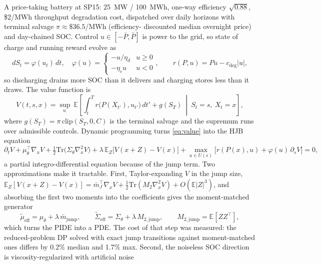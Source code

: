 \documentclass[11pt]{article}
\begin{document}
A price-taking battery at SP15: 25~MW / 100~MWh, one-way efficiency
$\sqrt{0.88}$, \$2/MWh throughput degradation cost, dispatched over daily
horizons with terminal salvage $\pi \approx \$36.5$/MWh (efficiency-%
discounted median overnight price) and day-chained SOC. Control $u \in [-\bar P, \bar P]$ is power to the grid, so state of charge
and running reward evolve as
\begin{equation}
dS_t = \varphi(u_t)\,dt, \quad
\varphi(u) = \begin{cases} -u/\eta_d & u \ge 0 \\ -\eta_c u & u < 0
\end{cases}, \qquad r(P, u) = Pu - c_{\deg}|u| ,
\label{eq:soc}
\end{equation}
so discharging drains more SOC than it delivers and charging stores less
than it draws. The value function is
\begin{equation}
V(t, s, x) = \sup_{u_\cdot}\ \mathbb{E}\left[\int_t^T
r\big(P(X_{t'}), u_{t'}\big)\,dt' + g(S_T)\ \middle|\
S_t = s,\ X_t = x\right],
\label{eq:value}
\end{equation}
where $g(S_T) = \pi\,\mathrm{clip}(S_T, 0, C)$ is the terminal salvage and
the supremum runs over admissible controls. Dynamic programming turns
\eqref{eq:value} into the HJB equation
\begin{equation}
\partial_t V + \mu_\theta^\top \nabla_x V + \tfrac12
\mathrm{Tr}\big(\Sigma_\theta \nabla^2_x V\big)
+ \lambda\,\mathbb{E}_Z\big[V(x{+}Z) - V(x)\big]
+ \max_{u \in U(s)}\big[r(P(x),u) + \varphi(u)\,\partial_s V\big] = 0,
\label{eq:hjb}
\end{equation}
a partial integro-differential equation because of the jump term.
Two approximations make it tractable. First, Taylor-expanding $V$ in the jump size,
$\mathbb{E}_Z[V(x{+}Z) - V(x)] = \bar m_J^\top \nabla_x V +
\tfrac12 \mathrm{Tr}(M_2 \nabla_x^2 V) + O(\mathbb{E}|Z|^3)$, and
absorbing the first two moments into the coefficients gives the
moment-matched generator
\begin{equation}
\tilde\mu_{\text{eff}} = \mu_\theta + \lambda\,\bar m_{\text{jump}}, \qquad
\tilde\Sigma_{\text{eff}} = \Sigma_\theta + \lambda\,M_{2,\text{jump}}, \qquad
M_{2,\text{jump}} = \mathbb{E}[ZZ^\top] ,
\label{eq:momentmatch}
\end{equation}
which turns the PIDE into a PDE. The cost of that step was measured: the
reduced-problem DP solved with exact jump transitions against
moment-matched ones differs by 0.2\% median and 1.7\% max. Second, the
noiseless SOC direction is viscosity-regularized with artificial noise
\end{document}
